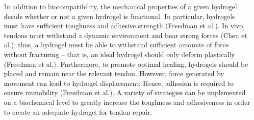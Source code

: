 In addition to biocompatibility, the mechanical properties of a given hydrogel decide whether or not a given hydrogel is functional.
In particular, hydrogels must have sufficient toughness and adhesive strength (Freedman et al.). In vivo, tendons must withstand a dynamic environment and bear strong forces (Chen et al.); thus, a hydrogel must be able to withstand sufficient amounts of force without fracturing – that is, an ideal hydrogel should only deform plastically (Freedman et al.). Furthermore, to promote optimal healing, hydrogels should be placed and remain near the relevant tendon. However, force generated by movement can lead to hydrogel displacement; Hence, adhesion is required to ensure immobility (Freedman et al.). A variety of strategies can be implemented on a biochemical level to greatly increase the toughness and adhesiveness in order to create an adequate hydrogel for tendon repair.